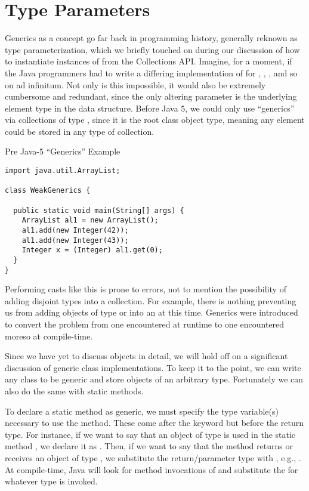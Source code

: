 \section{Type Parameters}

Generics as a concept go far back in programming history, generally reknown as type parameterization, which we briefly touched on during our discussion of how to instantiate instances of  from the Collections API. Imagine, for a moment, if the Java programmers had to write a differing implementation of  for , , , and so on ad infinitum. Not only is this impossible, it would also be extremely cumbersome and redundant, since the only altering parameter is the underlying element type in the data structure. Before Java 5, we could only use ``generics'' via collections of type , since it is the root class object type, meaning any element could be stored in any type of collection.

\begin{cl}[]{Pre Java-5 ``Generics'' Example}
\begin{lstlisting}[language=MyJava]
import java.util.ArrayList;

class WeakGenerics {

  public static void main(String[] args) {
    ArrayList al1 = new ArrayList();
    al1.add(new Integer(42));
    al1.add(new Integer(43));
    Integer x = (Integer) al1.get(0);
  }
}
\end{lstlisting}
\end{cl}

Performing casts like this is prone to errors, not to mention the possibility of adding disjoint types into a collection. For example, there is nothing preventing us from adding objects of type  or  into an  at this time. Generics were introduced to convert the problem from one encountered at runtime to one encountered moreso at compile-time. 

Since we have yet to discuss objects in detail, we will hold off on a significant discussion of generic class implementations. To keep it to the point, we can write any class to be generic and store objects of an arbitrary type. Fortunately we can also do the same with static methods. 

To declare a static method as generic, we must specify the type variable(s) necessary to use the method. These come after the  keyword but before the return type. For instance, if we want to say that an object of type  is used in the static method , we declare it as . Then, if we want to say that the method returns or receives an object of type , we substitute the return/parameter type with , e.g., . At compile-time, Java will look for method invocations of  and substitute the  for whatever type  is invoked. 

